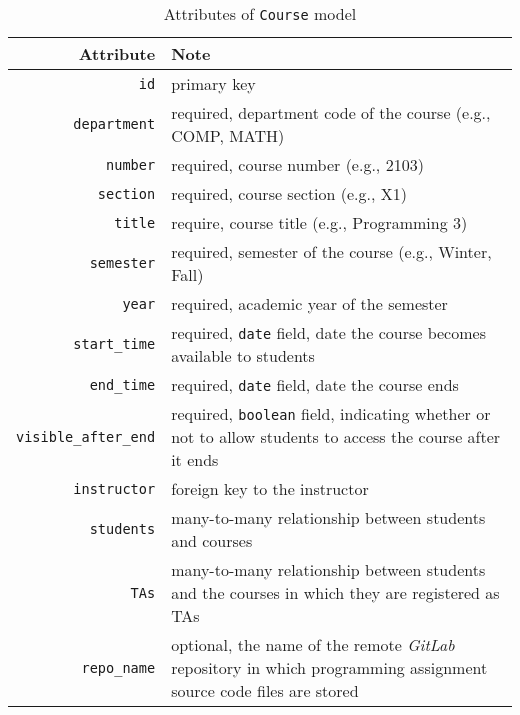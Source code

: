 \begin{table}[H]
    \centering
    \caption{Attributes of \texttt{Course} model}
    \label{tab:COURSE_ATTR}
    \renewcommand{\arraystretch}{1}
    \begin{tabular}[H]{r|p{4in}}
        \hline
        Attribute & Note \\
        \hline
        \hline
        \texttt{id} & primary key \\
        \hline
        \texttt{department} & required, department code of the course
            (e.g., COMP, MATH) \\
        \hline
        \texttt{number} & required, course number (e.g., 2103)\\
        \hline
        \texttt{section} & required, course section (e.g., X1) \\
        \hline
        \texttt{title} & require, course title (e.g., Programming 3)\\
        \hline
        \texttt{semester} & required, semester of the course
            (e.g., Winter, Fall) \\
        \hline
        \texttt{year} & required, academic year of the semester \\
        \hline
        \texttt{start\_time} & required, \texttt{date} field, date the course
            becomes available to  students \\
        \hline
        \texttt{end\_time} & required, \texttt{date} field, date the course
            ends \\
        \hline
        \texttt{visible\_after\_end} & required, \texttt{boolean} field,
            indicating whether or not to allow students to access the course
            after it ends \\
        \hline
        \hline

        \texttt{instructor} & foreign key to the instructor \\
        \hline
        \texttt{students} & many-to-many relationship between students and
            courses \\
        \hline
        \texttt{TAs} & many-to-many relationship between students and the
            courses in which they are registered as TAs \\

        \hline
        \hline

        \texttt{repo\_name} & optional, the name of the remote \emph{GitLab}
            repository  in 
            which programming assignment source code files  are stored \\
        \hline
        \hline


\end{tabular}
\end{table}
